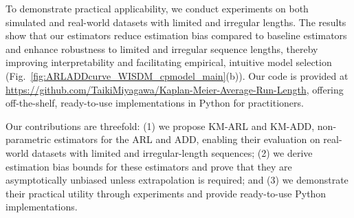 \documentclass{article}
\theoremstyle{plain}
\theoremstyle{definition}
\theoremstyle{remark}
\begin{document}
To demonstrate practical applicability,
we conduct experiments on both simulated and real-world datasets with limited and irregular lengths. 
The results show that our estimators reduce estimation bias compared to baseline estimators and enhance robustness to limited and irregular sequence lengths, thereby improving interpretability and facilitating empirical, intuitive model selection (Fig.~\ref{fig:ARLADDcurve_WISDM_cpmodel_main}(b)).
Our code is provided at \url{https://github.com/TaikiMiyagawa/Kaplan-Meier-Average-Run-Length}, offering off-the-shelf, ready-to-use implementations in Python \citep{Python3} for practitioners.

Our contributions are threefold: 
(1) we propose KM-ARL and KM-ADD, non-parametric estimators for the ARL and ADD, enabling their evaluation on real-world datasets with limited and irregular-length sequences;
(2) we derive estimation bias bounds for these estimators and prove that they are asymptotically unbiased unless extrapolation is required;
and (3) we demonstrate their practical utility through experiments and provide ready-to-use Python implementations.
















\end{document}
